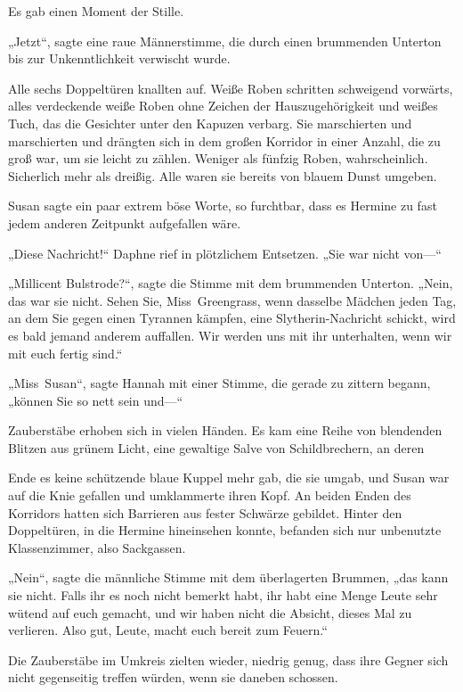 {Es gab einen Moment der Stille.

„Jetzt“, sagte eine raue Männerstimme, die durch einen brummenden Unterton bis zur Unkenntlichkeit verwischt wurde.

Alle sechs Doppeltüren knallten auf. Weiße Roben schritten schweigend vorwärts, alles verdeckende weiße Roben ohne Zeichen der Hauszugehörigkeit und weißes Tuch, das die Gesichter unter den Kapuzen verbarg. Sie marschierten und marschierten und drängten sich in dem großen Korridor in einer Anzahl, die zu groß war, um sie leicht zu zählen. Weniger als fünfzig Roben, wahrscheinlich. Sicherlich mehr als dreißig. Alle waren sie bereits von blauem Dunst umgeben.

Susan sagte ein paar extrem böse Worte, so furchtbar, dass es Hermine zu fast jedem anderen Zeitpunkt aufgefallen wäre.

„Diese Nachricht!“ Daphne rief in plötzlichem Entsetzen. „Sie war nicht von—“

„Millicent Bulstrode?“, sagte die Stimme mit dem brummenden Unterton. „Nein, das war sie nicht. Sehen Sie, Miss~Greengrass, wenn dasselbe Mädchen jeden Tag, an dem Sie gegen einen Tyrannen kämpfen, eine Slytherin-Nachricht schickt, wird es bald jemand anderem auffallen. Wir werden uns mit ihr unterhalten, wenn wir mit euch fertig sind.“

„Miss~Susan“, sagte Hannah mit einer Stimme, die gerade zu zittern begann, „können Sie so nett sein und—“

Zauberstäbe erhoben sich in vielen Händen. Es kam eine Reihe von blendenden Blitzen aus grünem Licht, eine gewaltige Salve von Schildbrechern, an deren

Ende es keine schützende blaue Kuppel mehr gab, die sie umgab, und Susan war auf die Knie gefallen und umklammerte ihren Kopf. An beiden Enden des Korridors hatten sich Barrieren aus fester Schwärze gebildet. Hinter den Doppeltüren, in die Hermine hineinsehen konnte, befanden sich nur unbenutzte Klassenzimmer, also Sackgassen.

„Nein“, sagte die männliche Stimme mit dem überlagerten Brummen, „das kann sie nicht. Falls ihr es noch nicht bemerkt habt, ihr habt eine Menge Leute sehr wütend auf euch gemacht, und wir haben nicht die Absicht, dieses Mal zu verlieren. Also gut, Leute, macht euch bereit zum Feuern.“

Die Zauberstäbe im Umkreis zielten wieder, niedrig genug, dass ihre Gegner sich nicht gegenseitig treffen würden, wenn sie daneben schossen.

}
